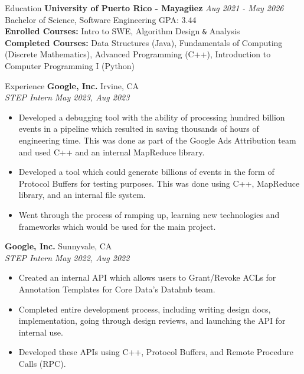 \documentclass{resume} %
\begin{document}

\begin{rSection}{Education}
{\bf University of Puerto Rico - Mayagüez} \hfill {\em Aug 2021 - May 2026} 
\\ Bachelor of Science, Software Engineering\hfill { GPA: 3.44 }
\\ {\bf Enrolled Courses:} Intro to SWE, Algorithm Design \verb|&| Analysis
\\
{\bf Completed Courses:} Data Structures (Java), Fundamentals of Computing (Discrete Mathematics), Advanced Programming (C++), Introduction to Computer Programming I (Python)
\end{rSection}
\begin{rSection}{Experience}
{\bf Google, Inc.} \hfill {Irvine, CA}
\\
\textit{STEP Intern} \hfill {\em May 2023, Aug 2023}
\vspace{-0.2\baselineskip} %
\begin{itemize}[noitemsep]
    \item Developed a debugging tool with the ability of processing hundred billion events in a pipeline which resulted in saving thousands of hours of engineering time. This was done as part of the Google Ads Attribution team and used C++ and an internal MapReduce library.
    \item Developed a tool which could generate billions of events in the form of Protocol Buffers for testing purposes. This was done using C++, MapReduce library, and an internal file system.
    \item Went through the process of ramping up, learning new technologies and frameworks which would be used for the main project. 
\end{itemize}

{\bf Google, Inc.} \hfill {Sunnyvale, CA}
\\
\textit{STEP Intern} \hfill {\em May 2022, Aug 2022}
\vspace{-0.2\baselineskip} %
\begin{itemize}[noitemsep]
    \item Created an internal API which allows users to Grant/Revoke ACLs for Annotation Templates for Core Data’s Datahub team.
    \item Completed entire development process, including writing design docs, implementation, going through design reviews, and launching the API for internal use.
    \item Developed these APIs using C++, Protocol Buffers, and Remote Procedure Calls (RPC).
\end{itemize}
\end{rSection}
\end{document}
